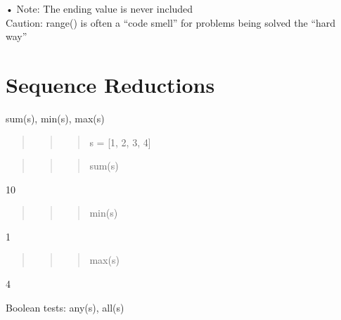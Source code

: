 \documentclass[
  letterpaper,
  DIV=11,
  numbers=noendperiod]{scrreprt}
\begin{document}
• Note: The ending value is never included\\
Caution: range() is often a ``code smell'' for problems being solved the
``hard way''


\chapter{Sequence Reductions}\label{sequence-reductions}

sum(s), min(s), max(s)

\begin{quote}
\begin{quote}
\begin{quote}
s = {[}1, 2, 3, 4{]}
\end{quote}
\end{quote}
\end{quote}

\begin{quote}
\begin{quote}
\begin{quote}
sum(s)
\end{quote}
\end{quote}
\end{quote}

10

\begin{quote}
\begin{quote}
\begin{quote}
min(s)
\end{quote}
\end{quote}
\end{quote}

1

\begin{quote}
\begin{quote}
\begin{quote}
max(s)
\end{quote}
\end{quote}
\end{quote}

4

\begin{quote}
\begin{quote}
\begin{quote}
\end{quote}
\end{quote}
\end{quote}

Boolean tests: any(s), all(s)
\end{document}
